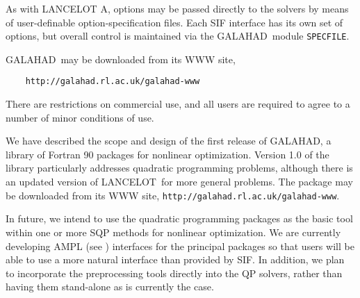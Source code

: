 \documentclass[twoside]{article}
\newcommand{\gal}{{\sf GALAHAD}}
\newcommand{\lan}{{\sf LANCELOT}}
\newcommand{\lana}{{\sf LANCELOT A}}
\begin{document}
As with \lana, options may be passed directly to the solvers by means of
user-definable option-specification files. Each SIF interface 
has its own set of options, but overall control is maintained via 
the \gal\ module {\tt SPECFILE}.

{}

\gal\ may be downloaded from its WWW site,
\begin{verbatim}
    http://galahad.rl.ac.uk/galahad-www
\end{verbatim}
There are restrictions on commercial use, and all users are required to
agree to a number of minor conditions of use.


We have described the scope and design of the first release of \gal,
a library of Fortran 90 packages for nonlinear optimization.
Version 1.0 of the library particularly addresses quadratic programming 
problems, although there is an updated version of \lan\ for more general 
problems. The package may be downloaded from its WWW site,
{\tt http://galahad.rl.ac.uk/galahad-www}.

In future, we intend to use the quadratic programming packages as the
basic tool within one or more SQP methods for nonlinear optimization.
We are currently developing AMPL (see ) interfaces 
for the principal packages so that users will be able to use a more
natural interface than provided by SIF. In addition, we plan to incorporate
the preprocessing tools directly into the QP solvers, rather than having
them stand-alone as is currently the case.

\newpage
\end{document}
